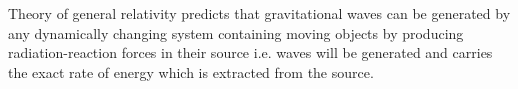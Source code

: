 Theory of general relativity predicts that gravitational waves can be generated by any dynamically changing system containing moving objects by producing radiation-reaction forces in their source i.e. waves will be generated and carries the exact rate of energy which is extracted from the source.   